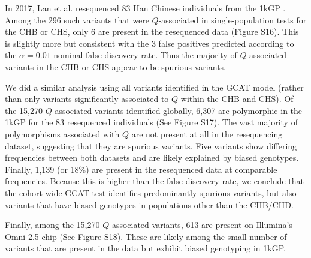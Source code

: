 \documentclass[9pt,article]{template}
\begin{document}
In 2017, Lan et al. resequenced 83 Han Chinese individuals from the 1kGP \citep{Lan2017}. 
Among the 296 such variants that were $Q$-associated in single-population tests for the CHB or CHS, only 6 are present in the resequenced data (Figure S16). %
This is slightly more but consistent with the 3 false positives predicted according to the $\alpha = 0.01$ nominal false discovery rate. 
Thus the majority of $Q$-associated variants in the CHB or CHS  appear to be spurious variants. 

We did a similar analysis using all variants identified in the GCAT model (rather than only variants significantly associated to $Q$ within the CHB and CHS). 
Of the 15,270 $Q$-associated variants identified globally, 6,307 are polymorphic in the 1kGP for the 83 resequenced individuals  (See Figure S17). %
The vast majority of polymorphisms associated with $Q$ are not present at all in the resequencing dataset, suggesting that they are spurious variants.
Five variants show differing frequencies between both datasets and are likely explained by biased genotypes.
Finally, 1,139 (or 18\%) are present in the resequenced data at comparable frequencies.
Because this is higher than the false discovery rate, we conclude that the cohort-wide GCAT test identifies predominantly spurious variants, but also variants that have biased genotypes in populations other than the CHB/CHD. 

Finally, among the 15,270 $Q$-associated variants, 613 are present on Illumina's Omni 2.5 chip (See Figure S18). %
These are likely among the small number of variants that are present in the data but exhibit biased genotyping in 1kGP. 
\end{document}
